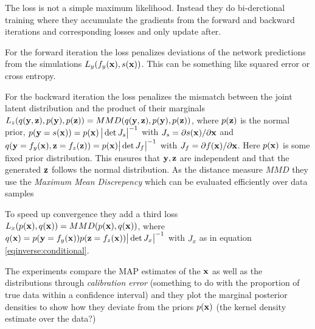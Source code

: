 The loss is not a simple maximum likelihood.
Instead they do bi-derctional training where they accumulate the gradients from the forward and backward iterations and corresponding losses and only update after.
\begin{compactitem}
\item For the forward iteration the loss penalizes deviations of the network predictions from the simulations $L_y(f_y(\mathbf{x}), s(\mathbf{x}))$. This can be something like squared error or cross entropy.
\item For the backward iteration the loss penalizes the mismatch between the joint latent distribution and the product of their marginals $L_z(q(\mathbf{y}, \mathbf{z}), p(\mathbf{y}), p(\mathbf{z})) = MMD(q(\mathbf{y}, \mathbf{z}), p(\mathbf{y}), p(\mathbf{z}))$, where
$p(\mathbf{z})$ is the normal prior, $p(\mathbf{y} = s(\mathbf{x})) = p(\mathbf{x}) \, \big\lvert \det J_s \big\rvert^{-1}$ with $J_s = \partial s(\mathbf{x}) / \partial \mathbf{x}$ and $q(\mathbf{y} = f_y(\mathbf{x}), \mathbf{z}= f_z(\mathbf{z})) = p(\mathbf{x}) \big\lvert \det J_f \big\rvert^{-1}$ with $J_f = \partial f(\mathbf{x}) / \partial \mathbf{x}$.
Here $p(\mathbf{x})$ is some fixed prior distribution.
This ensures that $\mathbf{y}, \mathbf{z}$ are independent and that the generated $\mathbf{z}$ follows the normal distribution.
As the distance measure $MMD$ they use the \emph{Maximum Mean Discrepency} which can be evaluated efficiently over data samples
\item To speed up convergence they add a third loss $L_x(p(\mathbf{x}), q(\mathbf{x})) = MMD(p(\mathbf{x}), q(\mathbf{x}))$, where $q(\mathbf{x}) = p(\mathbf{y} = f_y(\mathbf{x}))p(\mathbf{z} = f_z(\mathbf{x})) \big\lvert \det J_x \big\rvert^{-1}$ with $J_x$ as in equation \eqref{eqinverse:conditional}.
\end{compactitem}

The experiments compare the MAP estimates of the $\mathbf{x}$ as well as the distributions through \emph{calibration error} (something to do with the proportion of true data within a confidence interval) and they plot the marginal posterior densities to show how they deviate from the priors $p(\mathbf{x})$ (the kernel density estimate over the data?)



